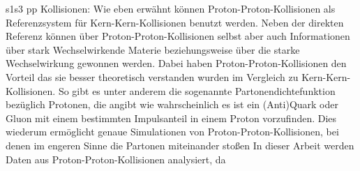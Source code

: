 s1s3 pp Kollisionen:
Wie eben erw\"ahnt k\"onnen Proton-Proton-Kollisionen als Referenzsystem f\"ur Kern-Kern-Kollisionen benutzt werden.
Neben der direkten Referenz k\"onnen \"uber Proton-Proton-Kollisionen selbst aber auch Informationen \"uber stark Wechselwirkende Materie beziehungsweise \"uber die starke Wechselwirkung gewonnen werden.
Dabei haben Proton-Proton-Kollisionen den Vorteil das sie besser theoretisch verstanden wurden im Vergleich zu Kern-Kern-Kollisionen.
So gibt es unter anderem die sogenannte Partonendichtefunktion bez\"uglich Protonen, die angibt wie wahrscheinlich es ist ein (Anti)Quark oder Gluon mit einem bestimmten Impulsanteil in einem Proton vorzufinden.
Dies wiederum erm\"oglicht genaue Simulationen von Proton-Proton-Kollisionen, bei denen im engeren Sinne die Partonen miteinander sto{\ss}en 
In dieser Arbeit werden Daten aus Proton-Proton-Kollisionen analysiert, da 